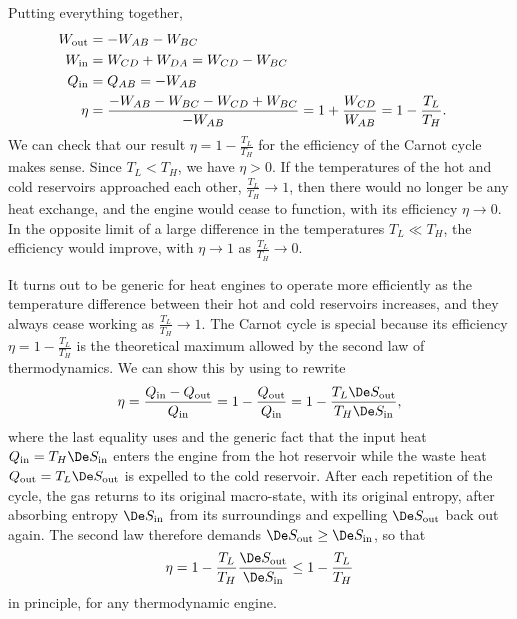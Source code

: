 Putting everything together,
\begin{align}
  W_{\text{out}} & = -W_{AB} - W_{BC} \cr
  W_{\text{in}} & = W_{CD} + W_{DA} = W_{CD} - W_{BC} \cr
  Q_{\text{in}} & = Q_{AB} = -W_{AB} \cr
  \eta & = \frac{-W_{AB} - W_{BC} - W_{CD} + W_{BC}}{-W_{AB}} = 1 + \frac{W_{CD}}{W_{AB}} = 1 - \frac{T_L}{T_H}.
\end{align}
We can check that our result $\eta = 1 - \frac{T_L}{T_H}$ for the efficiency of the Carnot cycle makes sense.
Since $T_L < T_H$, we have $\eta > 0$.
If the temperatures of the hot and cold reservoirs approached each other, $\frac{T_L}{T_H} \to 1$, then there would no longer be any heat exchange, and the engine would cease to function, with its efficiency $\eta \to 0$.
In the opposite limit of a large difference in the temperatures $T_L \ll T_H$, the efficiency would improve, with $\eta \to 1$ as $\frac{T_L}{T_H} \to 0$.

It turns out to be generic for heat engines to operate more efficiently as the temperature difference between their hot and cold reservoirs increases, and they always cease working as $\frac{T_L}{T_H} \to 1$.
The Carnot cycle is special because its efficiency $\eta = 1 - \frac{T_L}{T_H}$ is the theoretical maximum allowed by the second law of thermodynamics.
We can show this by using  to rewrite
\begin{equation*}
  \eta = \frac{Q_{\text{in}} - Q_{\text{out}}}{Q_{\text{in}}} = 1 - \frac{Q_{\text{out}}}{Q_{\text{in}}} = 1 - \frac{T_L \De S_{\text{out}}}{T_H \De S_{\text{in}}},
\end{equation*}
where the last equality uses  and the generic fact that the input heat $Q_{\text{in}} = T_H \De S_{\text{in}}$ enters the engine from the hot reservoir while the waste heat $Q_{\text{out}} = T_L \De S_{\text{out}}$ is expelled to the cold reservoir.
After each repetition of the cycle, the gas returns to its original macro-state, with its original entropy, after absorbing entropy $\De S_{\text{in}}$ from its surroundings and expelling $\De S_{\text{out}}$ back out again.
The second law therefore demands $\De S_{\text{out}} \geq \De S_{\text{in}}$, so that
\begin{equation*}
  \eta = 1 - \frac{T_L}{T_H} \frac{\De S_{\text{out}}}{\De S_{\text{in}}} \leq 1 - \frac{T_L}{T_H}
\end{equation*}
in principle, for any thermodynamic engine.

